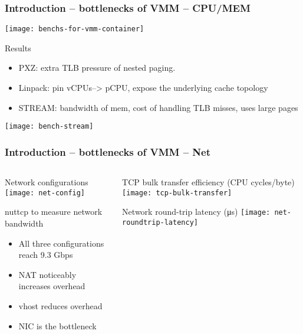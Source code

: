\begin{frame}[plain]
	\frametitle{Introduction -- bottlenecks of VMM -- CPU/MEM}
	
	\texttt{[image: benchs-for-vmm-container]}
	
	
	\large
	Results
	\begin{itemize}
		\item PXZ: extra TLB pressure of nested paging.
		\item Linpack:  pin vCPUs--> pCPU, expose the underlying
		cache topology
		\item STREAM: bandwidth of mem, cost of handling TLB misses, uses large pages
		
		
	\end{itemize}	
	\centering
	\texttt{[image: bench-stream]}
\end{frame}


\begin{frame}[plain]
	\frametitle{Introduction -- bottlenecks of VMM -- Net }
	
	
	
	\begin{columns}
		
		\begin{column}{.4\textwidth}
			
			Network configurations
			\texttt{[image: net-config]}
			
			
			\small
		     nuttcp to measure network bandwidth
			\begin{itemize}
			\item  All three configurations reach 9.3 Gbps
			\item NAT noticeably increases overhead
			\item vhost reduces overhead 
			\item NIC is the bottleneck
			
			\end{itemize}
		
		\end{column}
		
		\begin{column}{.6\textwidth}
			\centering
			TCP bulk transfer efficiency (CPU cycles/byte)
			\texttt{[image: tcp-bulk-transfer]}
			
			Network round-trip latency (μs)
			\texttt{[image: net-roundtrip-latency]}
		\end{column}
		
		
	\end{columns}
	
	
\end{frame}




